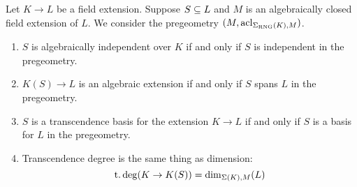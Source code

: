 
\begin{prop}
    Let $K \to L$ be a field extension.
    Suppose $S \subseteq L$ and 
    $M$ is an algebraically closed field extension of $L$.
    We consider the pregeometry $(M,\operatorname{acl}_{\Sigma_{\mathrm{RNG}}(K),M})$.
    \begin{enumerate}
        \item $S$ is algebraically independent over $K$ if and only if 
            $S$ is independent in the pregeometry.
        \item $K(S) \to L$ is an algebraic extension if and only if $S$ 
            spans $L$ in the pregeometry.
        \item $S$ is a transcendence basis for the extension $K \to L$ 
            if and only if 
            $S$ is a basis for $L$ in the pregeometry.
        \item Transcendence degree is the same thing as dimension:
            \[\operatorname{t.deg}(K \to K(S)) = \dim_{\Sigma(K),M}(L)\]
    \end{enumerate}
\end{prop}
